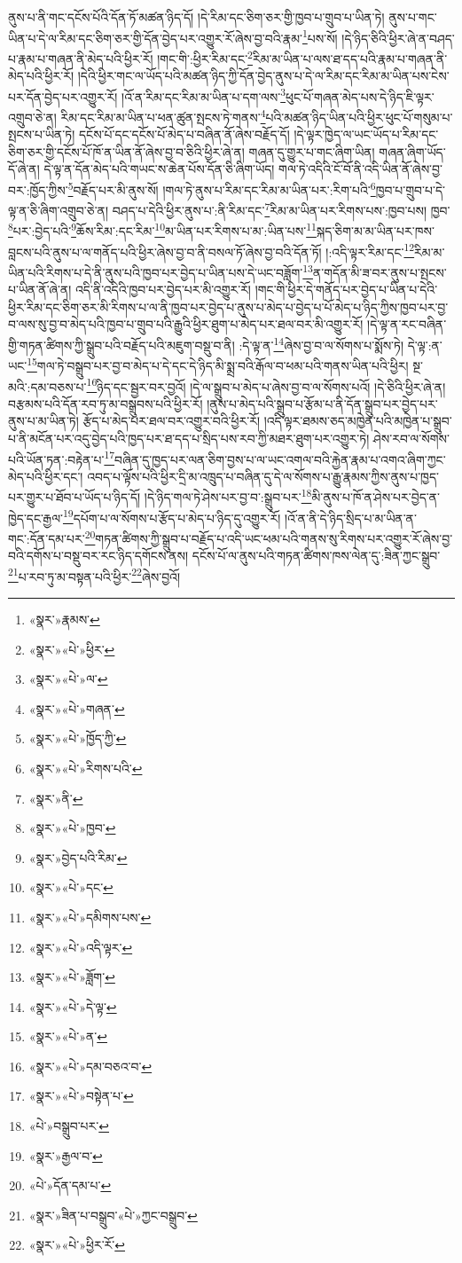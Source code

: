 ནུས་པ་ནི་གང་དངོས་པོའི་དོན་ཏོ་མཚན་ཉིད་དོ། །དེ་རིམ་དང་ཅིག་ཅར་གྱི་ཁྱབ་པ་གྲུབ་པ་ཡིན་ཏེ། ནུས་པ་གང་ཡིན་པ་དེ་ལ་རིམ་དང་ཅིག་ཅར་གྱི་དོན་བྱེད་པར་འགྱུར་རོ་ཞེས་བྱ་བའི་རྣམ་\footnote{«སྣར་»རྣམས་}པས་སོ། །དེ་ཉིད་ཅིའི་ཕྱིར་ཞེ་ན་བཤད་པ་རྣམ་པ་གཞན་ནི་མེད་པའི་ཕྱིར་རོ། །གང་གི་:ཕྱིར་རིམ་དང་\footnote{«སྣར་»«པེ་»ཕྱིར་}རིམ་མ་ཡིན་པ་ལས་ཐ་དད་པའི་རྣམ་པ་གཞན་ནི་མེད་པའི་ཕྱིར་རོ། །དེའི་ཕྱིར་གང་ལ་ཡོད་པའི་མཚན་ཉིད་ཀྱི་དོན་བྱེད་ནུས་པ་དེ་ལ་རིམ་དང་རིམ་མ་ཡིན་པས་ངེས་པར་དོན་བྱེད་པར་འགྱུར་རོ། །འོ་ན་རིམ་དང་རིམ་མ་ཡིན་པ་དག་ལས་\footnote{«སྣར་»«པེ་»ལ་}ཕུང་པོ་གཞན་མེད་པས་དེ་ཉིད་ཇི་ལྟར་འགྲུབ་ཅེ་ན། རིམ་དང་རིམ་མ་ཡིན་པ་ཕན་ཚུན་སྤངས་ཏེ་གནས་\footnote{«སྣར་»«པེ་»གཞན་}པའི་མཚན་ཉིད་ཡིན་པའི་ཕྱིར་ཕུང་པོ་གསུམ་པ་སྤངས་པ་ཡིན་ཏེ། དངོས་པོ་དང་དངོས་པོ་མེད་པ་བཞིན་ནོ་ཞེས་བརྗོད་དོ། །དེ་ལྟར་ཁྱེད་ལ་ཡང་ཡོད་པ་རིམ་དང་ཅིག་ཅར་གྱི་དངོས་པོ་ཁོ་ན་ཡིན་ནོ་ཞེས་བྱ་བ་ཅིའི་ཕྱིར་ཞེ་ན། གཞན་དུ་གྱུར་པ་གང་ཞིག་ཡིན། གཞན་ཞིག་ཡོད་དོ་ཞེ་ན། དེ་ལྟ་ན་དོན་མེད་པའི་གཡང་ས་ཆེན་པོས་དོན་ཅི་ཞིག་ཡོད། གལ་ཏེ་འདིའི་ངོ་བོ་ནི་འདི་ཡིན་ནོ་ཞེས་བྱ་བར་:ཁྱོད་ཀྱིས་\footnote{«སྣར་»«པེ་»ཁྱོད་ཀྱི་}བརྗོད་པར་མི་ནུས་སོ། །གལ་ཏེ་ནུས་པ་རིམ་དང་རིམ་མ་ཡིན་པར་:རིག་པའི་\footnote{«སྣར་»«པེ་»རིགས་པའི་}ཁྱབ་པ་གྲུབ་པ་དེ་ལྟ་ན་ཅི་ཞིག་འགྲུབ་ཅེ་ན། བཤད་པ་དེའི་ཕྱིར་ནུས་པ་:ནི་རིམ་དང་\footnote{«སྣར་»ནི་}རིམ་མ་ཡིན་པར་རིགས་པས་:ཁྱབ་པས། ཁྱབ་\footnote{«སྣར་»«པེ་»ཁྱབ་}པར་:བྱེད་པའི་\footnote{«སྣར་»བྱེད་པའི་རིམ་}ཆོས་རིམ་:དང་རིམ་\footnote{«སྣར་»«པེ་»དང་}མ་ཡིན་པར་རིགས་པ་མ་:ཡིན་པས་\footnote{«སྣར་»«པེ་»དམིགས་པས་}སྐད་ཅིག་མ་མ་ཡིན་པར་ཁས་བླངས་པའི་ནུས་པ་ལ་གནོད་པའི་ཕྱིར་ཞེས་བྱ་བ་ནི་བསལ་ཏོ་ཞེས་བྱ་བའི་དོན་ཏོ། །:འདི་ལྟར་རིམ་དང་\footnote{«སྣར་»«པེ་»འདི་ལྟར་}རིམ་མ་ཡིན་པའི་རིགས་པ་དེ་ནི་ནུས་པའི་ཁྱབ་པར་བྱེད་པ་ཡིན་པས་དེ་ཡང་བཟློག་\footnote{«སྣར་»«པེ་»ཟློག་}ན་གདོན་མི་ཟ་བར་ནུས་པ་སྤངས་པ་ཡིན་ནོ་ཞེ་ན། འདི་ནི་འདིའི་ཁྱབ་པར་བྱེད་པར་མི་འགྱུར་རོ། །གང་གི་ཕྱིར་དེ་གནོད་པར་བྱེད་པ་ཡིན་པ་དེའི་ཕྱིར་རིམ་དང་ཅིག་ཅར་མི་རིགས་པ་ལ་ནི་ཁྱབ་པར་བྱེད་པ་ནུས་པ་མེད་པ་བྱེད་པ་པོ་མེད་པ་ཉིད་ཀྱིས་ཁྱབ་པར་བྱ་བ་ལས་སུ་བྱ་བ་མེད་པའི་ཁྱབ་པ་གྲུབ་པའི་རྒྱུའི་ཕྱིར་ཐུག་པ་མེད་པར་ཐལ་བར་མི་འགྱུར་རོ། །དེ་ལྟ་ན་རང་བཞིན་གྱི་གཏན་ཚིགས་ཀྱི་སྒྲུབ་པའི་བརྗོད་པའི་མཇུག་བསྡུ་བ་ནི། :དེ་ལྟ་ན་\footnote{«སྣར་»«པེ་»དེ་ལྟ་}ཞེས་བྱ་བ་ལ་སོགས་པ་སྨོས་ཏེ། དེ་ལྟ་:ན་ཡང་\footnote{«སྣར་»«པེ་»ན་}གལ་ཏེ་བསྒྲུབ་པར་བྱ་བ་མེད་པ་དེ་དང་དེ་ཉིད་མི་སྨྲ་བའི་རྒོལ་བ་ཕམ་པའི་གནས་ཡིན་པའི་ཕྱིར། སྔ་མའི་:དམ་བཅས་པ་\footnote{«སྣར་»«པེ་»དམ་བཅའ་བ་}ཉིད་དང་སྦྱར་བར་བྱའོ། །དེ་ལ་སྒྲུབ་པ་མེད་པ་ཞེས་བྱ་བ་ལ་སོགས་པའོ། །དེ་ཅིའི་ཕྱིར་ཞེ་ན། བརྩམས་པའི་དོན་རབ་ཏུ་མ་བསྒྲུབས་པའི་ཕྱིར་རོ། །ནུས་པ་མེད་པའི་སྒྲུབ་པ་རྩོམ་པ་ནི་དོན་སྒྲུབ་པར་བྱེད་པར་ནུས་པ་མ་ཡིན་ཏེ། རྩོད་པ་མེད་པར་ཐལ་བར་འགྱུར་བའི་ཕྱིར་རོ། །འདི་ལྟར་ཐམས་ཅད་མཁྱེན་པའི་མཁྱེན་པ་སྒྲུབ་པ་ནི་མངོན་པར་འདུ་བྱེད་པའི་ཁྱད་པར་ཐ་དད་པ་སྲིད་པས་རབ་ཀྱི་མཐར་ཐུག་པར་འགྱུར་ཏེ། ཤེས་རབ་ལ་སོགས་པའི་ཡོན་ཏན་:བརྟེན་པ་\footnote{«སྣར་»«པེ་»བསྟེན་པ་}བཞིན་དུ་ཁྱད་པར་ལན་ཅིག་བྱས་པ་ལ་ཡང་འགལ་བའི་རྐྱེན་རྣམ་པ་འགའ་ཞིག་ཀྱང་མེད་པའི་ཕྱིར་དང་། འབད་པ་ལྟོས་པའི་ཕྱིར་དྲི་མ་འཁྲུད་པ་བཞིན་དུ་དེ་ལ་སོགས་པ་རྒྱུ་རྣམས་ཀྱིས་ནུས་པ་ཁྱད་པར་གྱུར་པ་ཐོབ་པ་ཡོད་པ་ཉིད་དོ། །དེ་ཉིད་གལ་ཏེ་ཤེས་པར་བྱ་བ་:སྒྲུབ་པར་\footnote{«པེ་»བསྒྲུབ་པར་}མི་ནུས་པ་ཁོ་ན་ཤེས་པར་བྱེད་ན་ཁྱེད་དང་རྒྱལ་\footnote{«སྣར་»རྒྱལ་བ་}དཔོག་པ་ལ་སོགས་པ་རྩོད་པ་མེད་པ་ཉིད་དུ་འགྱུར་རོ། །འོ་ན་ནི་དེ་ཉིད་སྲིད་པ་མ་ཡིན་ན་གང་:དོན་དམ་པར་\footnote{«པེ་»དོན་དམ་པ་}གཏན་ཚིགས་ཀྱི་སྒྲུབ་པ་བརྗོད་པ་འདི་ཡང་ཕམ་པའི་གནས་སུ་རིགས་པར་འགྱུར་རོ་ཞེས་བྱ་བའི་དགོས་པ་བསྡུ་བར་རང་ཉིད་དགོངས་ནས། དངོས་པོ་ལ་ནུས་པའི་གཏན་ཚིགས་ཁས་ལེན་དུ་:ཟིན་ཀྱང་སྒྲུབ་\footnote{«སྣར་»ཟིན་པ་བསྒྲུབ་«པེ་»ཀྱང་བསྒྲུབ་}པ་རབ་ཏུ་མ་བསྟན་པའི་ཕྱིར་\footnote{«སྣར་»«པེ་»ཕྱིར་རོ་}ཞེས་བྱའོ། 